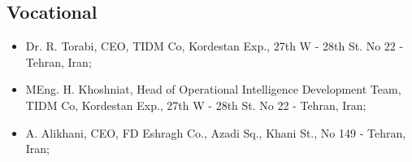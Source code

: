 \documentclass[11pt,a4paper,sans]{moderncv}        %
\begin{document}
\subsection{Vocational}
\begin{itemize}
\item Dr. R. Torabi, CEO, TIDM Co, Kordestan Exp., 27th W - 28th St. No 22 - Tehran, Iran;
\item MEng. H. Khoshniat, Head of Operational Intelligence Development Team, TIDM Co, Kordestan Exp., 27th W - 28th St. No 22 - Tehran, Iran;
\item A. Alikhani, CEO, FD Eshragh Co., Azadi Sq., Khani St., No 149 - Tehran, Iran;
\end{itemize}
\nocite{*}


\end{document}
